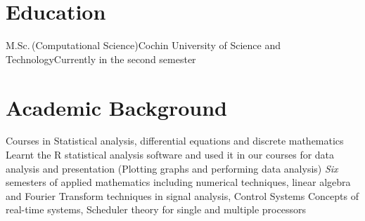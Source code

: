 \documentclass [a4paper,11pt]{moderncv}
\begin{document}
\maketitle
{}
\fontsize{11}{15}
\selectfont

\section{Education}
 {M.Sc.$\,$(Computational Science)}{Cochin University of Science and Technology}{}{\newline{}Currently in the second semester}{}

\section{Academic Background}
 {Courses in Statistical analysis, differential equations and discrete mathematics}
 {Learnt the R statistical analysis software and used it in our courses for data analysis and presentation (Plotting graphs and performing data analysis)}
 {\emph{Six} semesters of applied mathematics including numerical techniques, linear algebra and Fourier Transform techniques in signal analysis, Control Systems}
 {Concepts of real-time systems, Scheduler theory for single and multiple processors}
\end{document}
